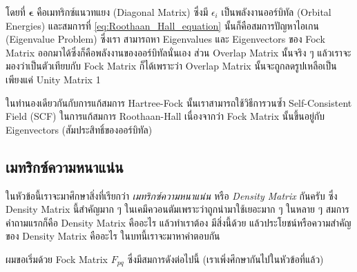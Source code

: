 \noindent โดยที่ $\boldsymbol{\epsilon}$ คือเมทริกซ์แนวทแยง (Diagonal Matrix) ซึ่งมี $\epsilon_i$ เป็นพลังงานออร์บิทัล 
(Orbital Energies) และสมการที่ \ref{eq:Roothaan_Hall_equation} นั้นก็คือสมการปัญหาไอเกน (Eigenvalue Problem) ซึ่งเรา%
สามารถหา Eigenvalues และ Eigenvectors ของ Fock Matrix ออกมาได้ซึ่งก็คือพลังงานของออร์บิทัลนั่นเอง ส่วน Overlap Matrix 
นั้นจริง ๆ แล้วเราจะมองว่าเป็นตัวเทียบกับ Fock Matrix ก็ได้เพราะว่า Overlap Matrix นั้นจะถูกลดรูปเหลือเป็นเพียงแค่ Unity Matrix 1 

ในทำนองเดียวกันกับการแก้สมการ Hartree-Fock นั้นเราสามารถใช้วิธีการวนซ้ำ Self-Consistent Field (SCF) ในการแก้สมการ 
Roothaan-Hall เนื่องจากว่า Fock Matrix นั้นขึ้นอยู่กับ Eigenvectors (สัมประสิทธิ์ของออร์บิทัล)

\subsection{เมทริกซ์ความหนาแน่น}

ในหัวข้อนี้เราจะมาศึกษาสิ่งที่เรียกว่า \textit{เมทริกซ์ความหนาแน่น} หรือ \textit{Density Matrix} กันครับ ซึ่ง Density Matrix 
นี้สำคัญมาก ๆ ในเคมีควอนตัมเพราะว่าถูกนำมาใช้เยอะมาก ๆ ในหลาย ๆ สมการ คำถามแรกก็คือ Density Matrix คืออะไร แล้วทำเราต้อง%
มีสิ่งนี้ด้วย แล้วประโยชน์หรือความสำคัญของ Density Matrix คืออะไร ในบทนี้เราจะมาหาคำตอบกัน 

ผมขอเริ่มด้วย Fock Matrix $F_{p q}$  ซึ่งมีสมการดังต่อไปนี้ (เราเพิ่งศึกษากันไปในหัวข้อที่แล้ว) 

